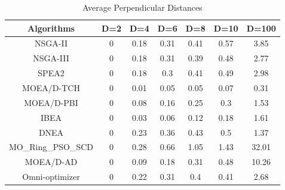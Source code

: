 \documentclass[conference]{IEEEtran}
\begin{document}
\begin{table}[t!]
\centering
\caption{Average Perpendicular Distances}
\begin{tabular}{@{}ccccccc@{}}
\toprule
Algorithms         & D=2 & D=4                           & D=6                           & D=8                           & D=10                          & D=100                         \\ \midrule
NSGA-II            & 0  & 0.18                         & 0.31                         & 0.41                         & 0.57                         & 3.85                         \\
NSGA-III           & 0  & 0.18                         & 0.31                         & 0.39                         & 0.48                         & 2.77                         \\
SPEA2              & 0  & 0.18                         & 0.3                          & 0.41                         & 0.49                         & 2.98                         \\
MOEA/D-TCH         & 0  & \cellcolor[HTML]{F8FF00}0.01 & \cellcolor[HTML]{F8FF00}0.05 & \cellcolor[HTML]{F8FF00}0.05 & \cellcolor[HTML]{F8FF00}0.07 & \cellcolor[HTML]{F8FF00}0.31 \\
MOEA/D-PBI         & 0  & 0.08                         & 0.16                         & 0.25                         & 0.3                          & 1.53                         \\
IBEA               & 0  & 0.03                         & 0.06                         & 0.12                         & 0.18                         & 1.61                         \\
DNEA               & 0  & 0.23                         & 0.36                         & 0.43                         & 0.5                          & 1.37                         \\
MO\_Ring\_PSO\_SCD & 0  & 0.28                         & 0.66                         & 1.05                         & 1.43                         & 32.01                        \\
MOEA/D-AD          & 0  & 0.09                         & 0.18                         & 0.31                         & 0.48                         & 10.26                        \\
Omni-optimizer     & 0  & 0.22                      & 0.31                         & 0.4                          & 0.41                         & 2.68                         \\ \bottomrule
\end{tabular}
\label{table: Perpendicular Distance}
\end{table}
\end{document}
